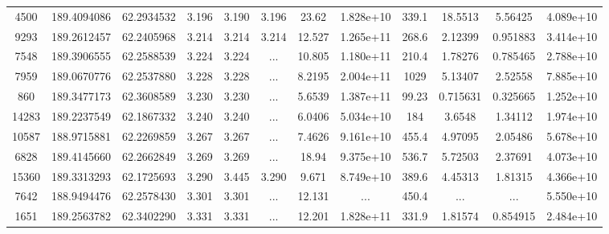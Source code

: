 \begin{table*}
\begin{tabular}{cccccccccccc}
           4500 &     189.4094086 &      62.2934532 &           3.196 &           3.190 &           3.196 &           23.62 &       1.828e+10 &           339.1 &         18.5513 &         5.56425 &       4.089e+10 \\
           9293 &     189.2612457 &      62.2405968 &           3.214 &           3.214 &           3.214 &          12.527 &       1.265e+11 &           268.6 &         2.12399 &        0.951883 &       3.414e+10 \\
           7548 &     189.3906555 &      62.2588539 &           3.224 &           3.224 &             ... &          10.805 &       1.180e+11 &           210.4 &         1.78276 &        0.785465 &       2.788e+10 \\
           7959 &     189.0670776 &      62.2537880 &           3.228 &           3.228 &             ... &          8.2195 &       2.004e+11 &            1029 &         5.13407 &         2.52558 &       7.885e+10 \\
            860 &     189.3477173 &      62.3608589 &           3.230 &           3.230 &             ... &          5.6539 &       1.387e+11 &           99.23 &        0.715631 &        0.325665 &       1.252e+10 \\
          14283 &     189.2237549 &      62.1867332 &           3.240 &           3.240 &             ... &          6.0406 &       5.034e+10 &             184 &          3.6548 &         1.34112 &       1.974e+10 \\
          10587 &     188.9715881 &      62.2269859 &           3.267 &           3.267 &             ... &          7.4626 &       9.161e+10 &           455.4 &         4.97095 &         2.05486 &       5.678e+10 \\
           6828 &     189.4145660 &      62.2662849 &           3.269 &           3.269 &             ... &           18.94 &       9.375e+10 &           536.7 &         5.72503 &         2.37691 &       4.073e+10 \\
          15360 &     189.3313293 &      62.1725693 &           3.290 &           3.445 &           3.290 &           9.671 &       8.749e+10 &           389.6 &         4.45313 &         1.81315 &       4.366e+10 \\
           7642 &     188.9494476 &      62.2578430 &           3.301 &           3.301 &             ... &          12.131 &             ... &           450.4 &             ... &             ... &       5.550e+10 \\
           1651 &     189.2563782 &      62.3402290 &           3.331 &           3.331 &             ... &          12.201 &       1.828e+11 &           331.9 &         1.81574 &        0.854915 &       2.484e+10 \\

\end{tabular}
\end{table*}
